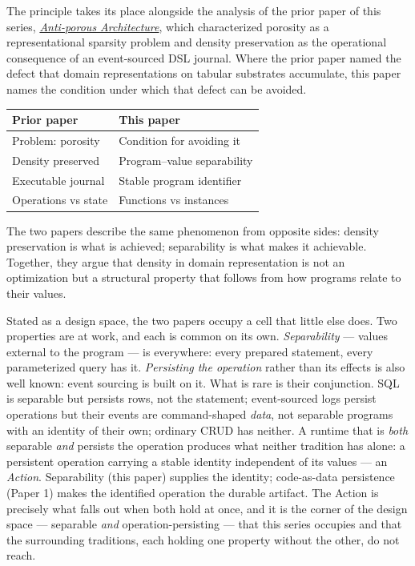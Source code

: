 \documentclass[
]{article}
\newcounter{none} %
\begin{document}
The principle takes its place alongside the analysis of the prior paper
of this series, \href{01-anti-porosity.md}{\emph{Anti-porous
Architecture}}, which characterized porosity as a representational
sparsity problem and density preservation as the operational consequence
of an event-sourced DSL journal. Where the prior paper named the defect
that domain representations on tabular substrates accumulate, this paper
names the condition under which that defect can be avoided.

{\def\LTcaptype{none} %
\begin{longtable}[]{@{}ll@{}}
\toprule\noalign{}
Prior paper & This paper \\
\midrule\noalign{}
\endhead
\bottomrule\noalign{}
\endlastfoot
Problem: porosity & Condition for avoiding it \\
Density preserved & Program--value separability \\
Executable journal & Stable program identifier \\
Operations vs state & Functions vs instances \\
\end{longtable}
}

The two papers describe the same phenomenon from opposite sides: density
preservation is what is achieved; separability is what makes it
achievable. Together, they argue that density in domain representation
is not an optimization but a structural property that follows from how
programs relate to their values.

Stated as a design space, the two papers occupy a cell that little else
does. Two properties are at work, and each is common on its own.
\emph{Separability} --- values external to the program --- is
everywhere: every prepared statement, every parameterized query has it.
\emph{Persisting the operation} rather than its effects is also well
known: event sourcing is built on it. What is rare is their conjunction.
SQL is separable but persists rows, not the statement; event-sourced
logs persist operations but their events are command-shaped \emph{data},
not separable programs with an identity of their own; ordinary CRUD has
neither. A runtime that is \emph{both} separable \emph{and} persists the
operation produces what neither tradition has alone: a persistent
operation carrying a stable identity independent of its values --- an
\emph{Action}. Separability (this paper) supplies the identity;
code-as-data persistence (Paper 1) makes the identified operation the
durable artifact. The Action is precisely what falls out when both hold
at once, and it is the corner of the design space --- separable
\emph{and} operation-persisting --- that this series occupies and that
the surrounding traditions, each holding one property without the other,
do not reach.
\end{document}
